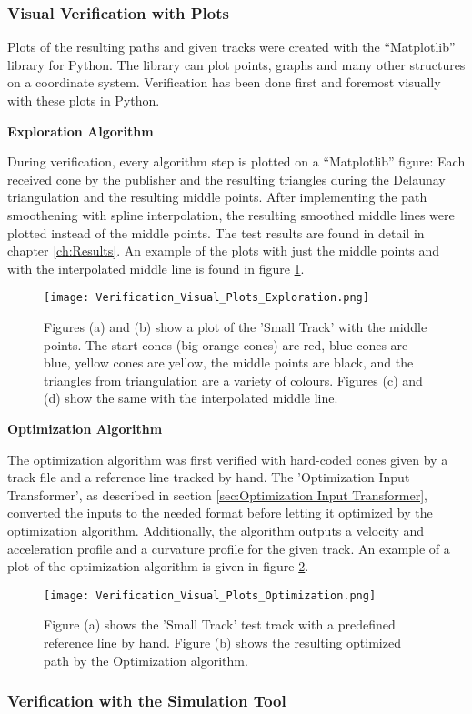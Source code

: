 \subsubsection{Visual Verification with Plots} \label{sec:Visual Verification with Plots}
Plots of the resulting paths and given tracks were created with the ``Matplotlib'' library for Python. The library can plot points, graphs and many other structures on a coordinate system. Verification has been done first and foremost visually with these plots in Python.

\textbf{Exploration Algorithm}

During verification, every algorithm step is plotted on a ``Matplotlib'' figure: Each received cone by the publisher and the resulting triangles during the Delaunay triangulation and the resulting middle points. After implementing the path smoothening with spline interpolation, the resulting smoothed middle lines were plotted instead of the middle points. The test results are found in detail in chapter \ref{ch:Results}. An example of the plots with just the middle points and with the interpolated middle line is found in figure \ref{fig:Verification Visual Plots Exploration}.

\begin{figure}[H]
    \centering
    \texttt{[image: Verification\_Visual\_Plots\_Exploration.png]}
    \caption{Figures (a) and (b) show a plot of the 'Small Track' with the middle points. The start cones (big orange cones) are red, blue cones are blue, yellow cones are yellow, the middle points are black, and the triangles from triangulation are a variety of colours. Figures (c) and (d) show the same with the interpolated middle line.}
    \label{fig:Verification Visual Plots Exploration}
\end{figure}

\textbf{Optimization Algorithm}

The optimization algorithm was first verified with hard-coded cones given by a track file and a reference line tracked by hand. The 'Optimization Input Transformer', as described in section \ref{sec:Optimization Input Transformer}, converted the inputs to the needed format before letting it optimized by the optimization algorithm. Additionally, the algorithm outputs a velocity and acceleration profile and a curvature profile for the given track. An example of a plot of the optimization algorithm is given in figure \ref{fig:Verification Visual Plots Optimization}.

\begin{figure}[H]
    \centering
    \texttt{[image: Verification\_Visual\_Plots\_Optimization.png]}
    \caption{Figure (a) shows the 'Small Track' test track with a predefined reference line by hand. Figure (b) shows the resulting optimized path by the Optimization algorithm.}
    \label{fig:Verification Visual Plots Optimization}
\end{figure}

\subsubsection{Verification with the Simulation Tool} \label{sec:Verification with the Simulation Tool}


